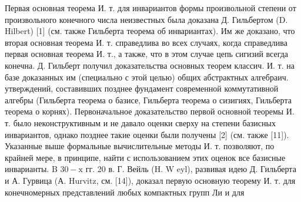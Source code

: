 \documentclass[10pt]{article}
\begin{document}
Первая основная теорема И. т. для инвариантов формы произвольной степени от произвольного конечного числа неизвестных была доказана Д. Гильбертом (D. Hilbert) [1] (см. также Гильберта теорема об инвариантах). Им же доказано, что вторая основная теорема И. т. справедлива во всех случаях, когда справедлива первая основная теорема И. т., а также, что в этом случае цепь сигизий всегда конечна. Д. Гильберт получил доказательства основных теорем классич. И. т. на базе доказанных им (специально с этой целью) общих абстрактных алгебраич. утверждений, составивших позднее фундамент современной коммутативной алгебры (Гильберта теорема о базисе, Гильберта теорема о сизигиях, Гильберта теорема о корнях). Первоначальное доказательство первой основной теоремы И. т. было неконструктивным и не давало оценки сверху на степени базисных инвариантов, однако позднее такие оценки были получены [2] (см. также [11]). Указанные выше формальные вычислительные методы И. т. позволяют, по крайней мере, в принципе, найти с использованием этих оценок все базисные инварианты. B $30-\mathrm{x}$ гг. 20 в. Г. Вейль (H. W eyl), развивая идею Д. Гильберта и А. Гурвица (А. Hurvitz, см. [14]), доказал первую основную теорему И. т. для конечномерных представлений любых компактных групп Ли и для
\end{document}
